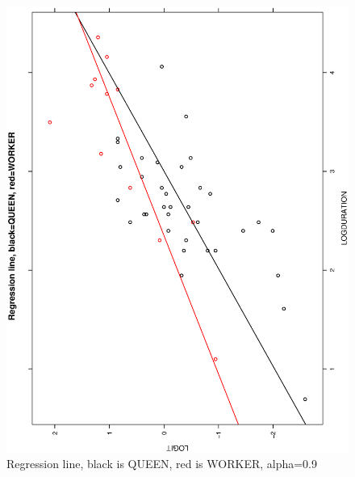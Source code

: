 \documentclass[a4paper,10pt]{article}
\begin{document}
\begin{figure}
\includegraphics[angle=-90, width=1\textwidth]{figures/math650_hw8_fig3_alpha0_9.eps}
\caption{Regression line, black is QUEEN, red is WORKER, alpha=0.9}\label{f3}
\end{figure}
\end{document}
